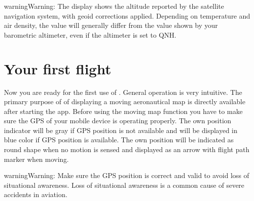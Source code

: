 \documentclass[letterpaper,10pt,english]{sphinxmanual}
\begin{document}
\begin{sphinxadmonition}{warning}{Warning:}
\sphinxAtStartPar
The display shows the altitude reported by the satellite navigation
system, with geoid corrections applied.  Depending on temperature and air
density, the value will generally differ from the value shown by your
barometric altimeter, even if the altimeter is set to QNH.  
\end{sphinxadmonition}


\section{Your first flight}
\label{\detokenize{01-intro/02-getting_started:your-first-flight}}
\sphinxAtStartPar
Now you are ready for the first use of . General
operation is very intuitive. The primary purpose of  of displaying a moving aeronautical map is directly available after
starting the app.  Before using the moving map function you have to make sure
the GPS of your mobile device is operating properly. The own position indicator
will be gray if GPS position is not available and will be displayed in blue
color if GPS position is available. The own position will be indicated as round
shape when no motion is sensed and displayed as an arrow with flight path marker
when moving.

\begin{sphinxadmonition}{warning}{Warning:}
\sphinxAtStartPar
Make sure the GPS position is correct and valid to avoid loss of
situational awareness. Loss of situational awareness is a common cause of
severe accidents in aviation.
\end{sphinxadmonition}
\end{document}
